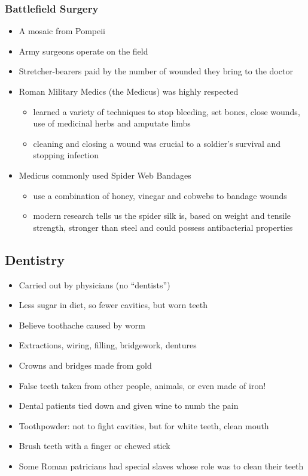 \documentclass[12pt, twoside]{article}
\begin{document}
\begin{itemize}
\subsubsection{Battlefield Surgery}
\begin{itemize}
\item A mosaic from Pompeii
\item Army surgeons operate on the field
\item Stretcher-bearers paid by the number of wounded they bring to the doctor
\item Roman Military Medics (the Medicus) was highly respected
	\begin{itemize}
	\item learned a variety of techniques to stop bleeding, set bones, close wounds, use of medicinal herbs and amputate limbs
	\item cleaning and closing a wound was crucial to a soldier’s survival and stopping infection
	\end{itemize}
\item Medicus commonly used Spider Web Bandages
	\begin{itemize}
	\item use a combination of honey, vinegar and cobwebs to bandage wounds
	\item modern research tells us the spider silk is, based on weight and tensile strength, stronger than steel and could possess antibacterial properties
	\end{itemize}
\end{itemize}	

\subsection{Dentistry}
\begin{itemize}
\item Carried out by physicians (no “dentists”)
\item Less sugar in diet, so fewer cavities, but worn teeth
\item Believe toothache caused by worm
\item Extractions, wiring, filling, bridgework, dentures
\item Crowns and bridges made from gold
\item False teeth taken from other people, animals, or even made of iron!
\item Dental patients tied down and given wine to numb the pain
\item Toothpowder: not to fight cavities, but for white teeth, clean mouth
\item Brush teeth with a finger or chewed stick
\item Some Roman patricians had special slaves whose role was to clean their teeth
\end{itemize}


\end{itemize}
\end{document}
